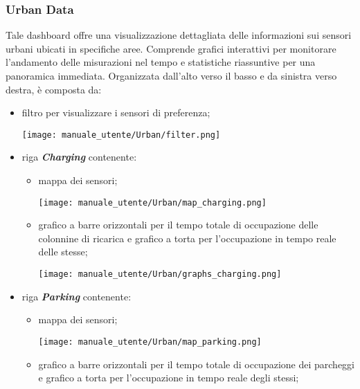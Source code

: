 \subsubsection{Urban Data}
Tale dashboard offre una visualizzazione dettagliata delle informazioni sui sensori urbani ubicati in specifiche aree. Comprende grafici interattivi per monitorare l'andamento delle misurazioni nel tempo e statistiche riassuntive per una panoramica immediata. Organizzata dall'alto verso il basso e da sinistra verso destra, è composta da:
\begin{itemize}
    \item filtro per visualizzare i sensori di preferenza;
    \begin{center}
        \texttt{[image: manuale\_utente/Urban/filter.png]}
    \end{center}
    \item riga \textit{\textbf{Charging}} contenente:
    \begin{itemize}
        \item mappa dei sensori;
        \begin{center}
            \texttt{[image: manuale\_utente/Urban/map\_charging.png]}
        \end{center}
        \item grafico a barre orizzontali per il tempo totale di occupazione delle colonnine di ricarica e grafico a torta per l'occupazione in tempo reale delle stesse;
        \begin{center}
            \texttt{[image: manuale\_utente/Urban/graphs\_charging.png]}
        \end{center}
    \end{itemize}
    \item riga \textit{\textbf{Parking}} contenente:
    \begin{itemize}
        \item mappa dei sensori;
        \begin{center}
            \texttt{[image: manuale\_utente/Urban/map\_parking.png]}
        \end{center}
        \item grafico a barre orizzontali per il tempo totale di occupazione dei parcheggi e grafico a torta per l'occupazione in tempo reale degli stessi;

\end{itemize}
\end{itemize}
